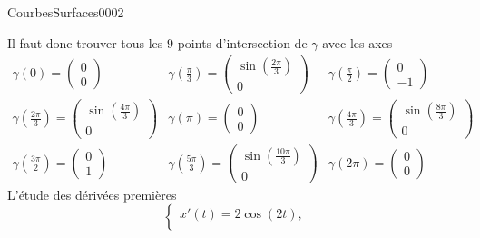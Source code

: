 \begin{corrige}{CourbesSurfaces0002}
\begin{enumerate}
Il faut donc trouver tous les $9$ points d'intersection de $\gamma$ avec les axes 
\begin{equation}
  \begin{array}{lll}
    \gamma(0)=
    \begin{pmatrix}
      0\\
      0
    \end{pmatrix} & \gamma\left(\frac{\pi}{3}\right)= 
    \begin{pmatrix}
      \sin\left(\frac{2\pi}{3}\right)\\
      0
    \end{pmatrix} & \gamma\left(\frac{\pi}{2}\right)= 
    \begin{pmatrix}
      0\\
      -1
    \end{pmatrix}\\
    \gamma\left(\frac{2\pi}{3}\right)= 
    \begin{pmatrix}
      \sin\left(\frac{4\pi}{3}\right)\\
      0
    \end{pmatrix} & \gamma(\pi)=
    \begin{pmatrix}
      0\\
      0
    \end{pmatrix} & \gamma\left(\frac{4\pi}{3}\right)= 
    \begin{pmatrix}
      \sin\left(\frac{8\pi}{3}\right)\\
      0
    \end{pmatrix} \\
     \gamma\left(\frac{3\pi}{2}\right)= 
    \begin{pmatrix}
      0\\
      1
    \end{pmatrix} & \gamma\left(\frac{5\pi}{3}\right)= 
    \begin{pmatrix}
      \sin\left(\frac{10\pi}{3}\right)\\
      0
    \end{pmatrix} & \gamma(2\pi)=
    \begin{pmatrix}
      0\\
      0
    \end{pmatrix} 
  \end{array}
\end{equation}
  L'étude des dérivées premières 
  \begin{equation}
    \left\{\begin{array}{l}
      x'(t)= 2\cos(2t),\\

\end{array}
\end{equation}
\end{enumerate}
\end{corrige}

